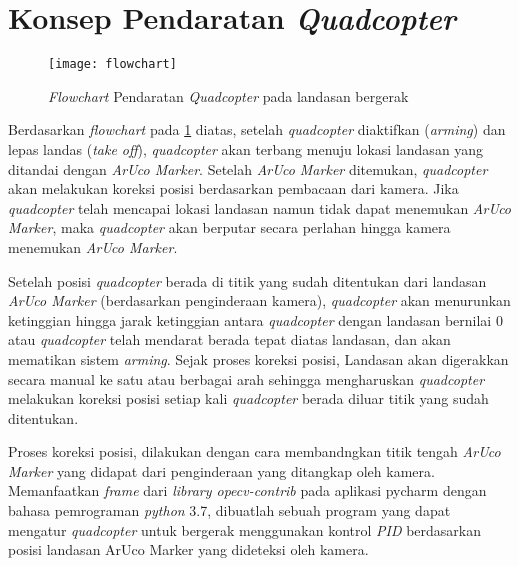 \section{Konsep Pendaratan \textit{Quadcopter}}

\begin{figure}[H]
	\centering
	\texttt{[image: flowchart]}
	\caption{\textit{Flowchart} Pendaratan \textit{Quadcopter} pada landasan bergerak}
	\label{fig:flowchart}
\end{figure}

Berdasarkan \textit{flowchart} pada \cref{fig:flowchart} diatas, setelah \textit{quadcopter} diaktifkan (\textit{arming}) dan lepas landas (\textit{take off}), \textit{quadcopter} akan terbang menuju lokasi landasan yang ditandai dengan \textit{ArUco Marker}. Setelah \textit{ArUco Marker} ditemukan, \textit{quadcopter} akan melakukan koreksi posisi berdasarkan pembacaan dari kamera. Jika \textit{quadcopter} telah mencapai lokasi landasan namun tidak dapat menemukan \textit{ArUco Marker}, maka \textit{quadcopter} akan berputar secara perlahan hingga kamera menemukan \textit{ArUco Marker}.

Setelah posisi \textit{quadcopter} berada di titik yang sudah ditentukan dari landasan \textit{ArUco Marker} (berdasarkan penginderaan kamera), \textit{quadcopter} akan menurunkan ketinggian hingga jarak ketinggian antara \textit{quadcopter} dengan landasan bernilai 0 atau \textit{quadcopter} telah mendarat berada tepat diatas landasan, dan akan mematikan sistem \textit{arming}.
Sejak proses koreksi posisi, Landasan akan digerakkan secara manual ke satu atau berbagai arah sehingga mengharuskan \textit{quadcopter} melakukan koreksi posisi setiap kali \textit{quadcopter} berada diluar titik yang sudah ditentukan.

Proses koreksi posisi, dilakukan dengan cara membandngkan titik tengah \textit{ArUco Marker} yang didapat dari penginderaan yang ditangkap oleh kamera. Memanfaatkan \textit{frame} dari \textit{library opecv-contrib} pada aplikasi pycharm dengan bahasa pemrograman \textit{python} 3.7, dibuatlah sebuah program yang dapat mengatur \textit{quadcopter} untuk bergerak menggunakan kontrol \textit{PID} berdasarkan posisi landasan ArUco Marker yang dideteksi oleh kamera.


